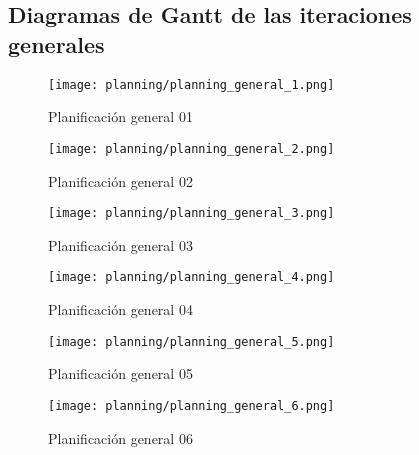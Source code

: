 \subsection{Diagramas de Gantt de las iteraciones generales}
\FloatBarrier
\begin{center}
\begin{figure}[h]
\centering
\texttt{[image: planning/planning\_general\_1.png]} \\
\caption{Planificación general 01 }
\end{figure}
\end{center}
\FloatBarrier

\FloatBarrier
\begin{center}
\begin{figure}[h]
\centering
\texttt{[image: planning/planning\_general\_2.png]} \\
\caption{Planificación general 02 }
\end{figure}
\end{center}
\FloatBarrier

\FloatBarrier
\begin{center}
\begin{figure}[h]
\centering
\texttt{[image: planning/planning\_general\_3.png]} \\
\caption{Planificación general 03 }
\end{figure}
\end{center}
\FloatBarrier

\FloatBarrier
\begin{center}
\begin{figure}[h]
\centering
\texttt{[image: planning/planning\_general\_4.png]} \\
\caption{Planificación general 04 }
\end{figure}
\end{center}
\FloatBarrier

\FloatBarrier
\begin{center}
\begin{figure}[h]
\centering
\texttt{[image: planning/planning\_general\_5.png]} \\
\caption{Planificación general 05 }
\end{figure}
\end{center}
\FloatBarrier

\FloatBarrier
\begin{center}
\begin{figure}[h]
\centering
\texttt{[image: planning/planning\_general\_6.png]} \\
\caption{Planificación general 06 }
\end{figure}
\end{center}
\FloatBarrier


